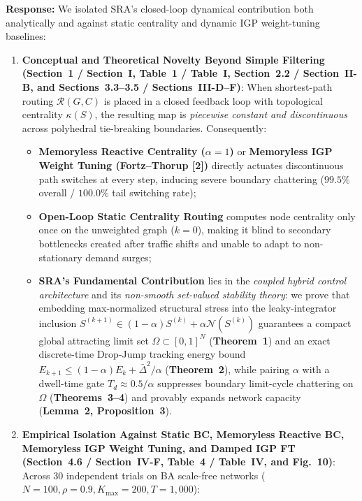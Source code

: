 \documentclass[11pt,a4paper]{article}
\begin{document}
\noindent\textbf{Response:} We isolated SRA's closed-loop dynamical contribution both analytically and against static centrality and dynamic IGP weight-tuning baselines:
\begin{enumerate}[leftmargin=1.8em]
    \item \textbf{Conceptual and Theoretical Novelty Beyond Simple Filtering (Section~1 / Section~I, Table~1 / Table~I, Section~2.2 / Section~II-B, and Sections~3.3--3.5 / Sections~III-D--F)}:
    When shortest-path routing $\mathcal{R}(G, C)$ is placed in a closed feedback loop with topological centrality $\kappa(S)$, the resulting map is \textit{piecewise constant and discontinuous} across polyhedral tie-breaking boundaries. Consequently:
    \begin{itemize}
        \item \textbf{Memoryless Reactive Centrality ($\alpha=1$)} or \textbf{Memoryless IGP Weight Tuning (Fortz--Thorup [2])} directly actuates discontinuous path switches at every step, inducing severe boundary chattering ($99.5\%$ overall / $100.0\%$ tail switching rate);
        \item \textbf{Open-Loop Static Centrality Routing} computes node centrality only once on the unweighted graph ($k=0$), making it blind to secondary bottlenecks created after traffic shifts and unable to adapt to non-stationary demand surges;
        \item \textbf{SRA's Fundamental Contribution} lies in the \textit{coupled hybrid control architecture} and its \textit{non-smooth set-valued stability theory}: we prove that embedding max-normalized structural stress into the leaky-integrator inclusion $S^{(k+1)} \in (1-\alpha)S^{(k)} + \alpha\mathcal{N}(S^{(k)})$ guarantees a compact global attracting limit set $\Omega \subset [0,1]^N$ (\textbf{Theorem~1}) and an exact discrete-time Drop-Jump tracking energy bound $E_{k+1} \le (1-\alpha)E_k + \bar{\Delta}^2/\alpha$ (\textbf{Theorem~2}), while pairing $\alpha$ with a dwell-time gate $T_d \approx 0.5/\alpha$ suppresses boundary limit-cycle chattering on $\Omega$ (\textbf{Theorems~3--4}) and provably expands network capacity (\textbf{Lemma~2, Proposition~3}).
    \end{itemize}
    \item \textbf{Empirical Isolation Against Static BC, Memoryless Reactive BC, Memoryless IGP Weight Tuning, and Damped IGP FT (Section~4.6 / Section~IV-F, Table~4 / Table~IV, and Fig.~10)}:
    Across 30 independent trials on BA scale-free networks ($N=100, \rho=0.9, K_{\max}=200, T=1{,}000$):

\end{enumerate}
\end{document}

